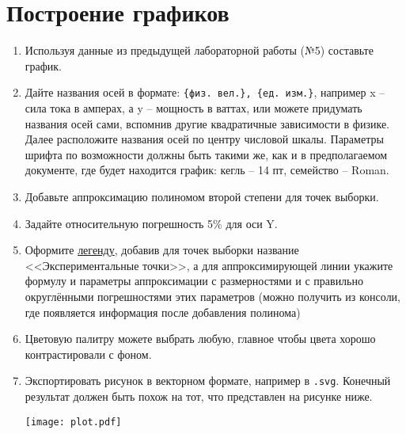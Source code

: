 \documentclass[14pt,a4paper]{article}
\begin{document}
\section{Построение графиков}
\begin{enumerate}
    \item Используя данные из предыдущей лабораторной работы (№5) составьте график. 
    \item Дайте названия осей в формате: \verb|{физ. вел.}, {ед. изм.}|, например x -- сила тока в амперах, а y -- мощность в ваттах, или можете придумать названия осей сами, вспомнив другие квадратичные зависимости в физике. Далее расположите названия осей по центру числовой шкалы. Параметры шрифта по возможности должны быть такими же, как и в предполагаемом документе, где будет находится график: кегль -- 14 пт, семейство -- Roman.
    \item Добавьте аппроксимацию полиномом второй степени для точек выборки.
    \item Задайте относительную погрешность 5\% для оси Y.
    \item Оформите \href{https://www.stimulsoft.com/ru/documentation/online/user-manual/index.html?report_internals_charts_chart_tab_legend.htm}{легенду}, добавив для точек выборки название <<Экспериментальные точки>>, а для аппроксимирующей линии укажите формулу и параметры аппроксимации с размерностями и с правильно округлёнными погрешностями этих параметров (можно получить из консоли, где появляется информация после добавления полинома)
    \item Цветовую палитру можете выбрать любую, главное чтобы цвета хорошо контрастировали с фоном. 
    \item Экспортировать рисунок в векторном формате, например в \verb|.svg|. Конечный результат должен быть похож на тот, что представлен на рисунке ниже.
    \begin{center}
        \texttt{[image: plot.pdf]}
    \end{center}
\end{enumerate}

% 
\end{document}
